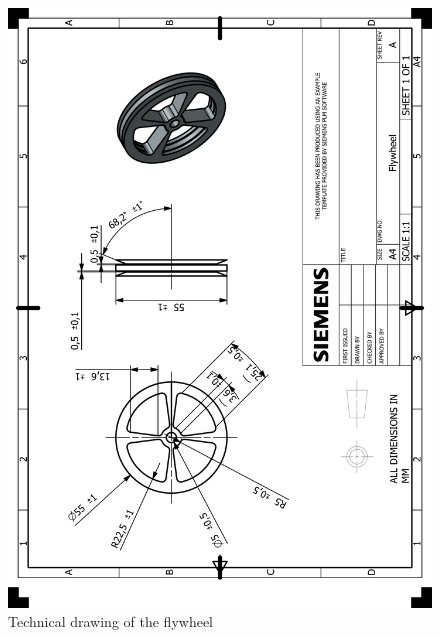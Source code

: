 \documentclass[12pt]{article}
\begin{document}
\begin{appendices}
\begin{figure}[H]
    \centering
    \includegraphics[width=\textwidth]{HP_Flywheel.png} 
    \caption{Technical drawing of the flywheel}
    \label{fig:technical-drawing}
\end{figure}


\end{appendices}
\end{document}
